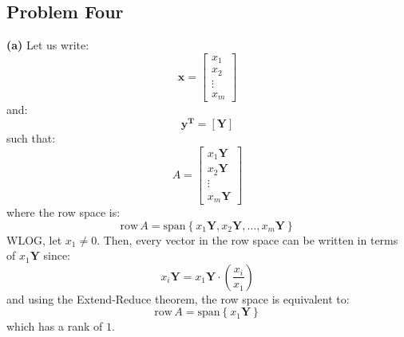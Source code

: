 \documentclass{article}
\newcommand{\spann}[1]{\mathrm{span}\left\{#1\right\}}
\newcommand{\row}[1]{\mathrm{row\,} #1}
\begin{document}
\subsection{Problem Four}
\noindent \textbf{(a)} Let us write:
\begin{equation}
    \bm{x} = \begin{bmatrix}
        x_1 \\ 
        x_2 \\ 
        \vdots \\ 
        x_m
    \end{bmatrix}
\end{equation}
and:
\begin{equation}
    \bm{y^T} = [\bm{Y}]
\end{equation}
such that:
\begin{equation}
    A = \begin{bmatrix}
        x_1\bm{Y} \\ 
        x_2\bm{Y} \\ 
        \vdots \\ 
        x_m\bm{Y}
    \end{bmatrix}
\end{equation}
where the row space is:
\begin{equation}
    \row A = \spann{x_1\bm{Y}, x_2\bm{Y}, \dots, x_m\bm{Y}}
\end{equation}
WLOG, let $x_1 \neq 0$. Then, every vector in the row space can be written in terms of $x_1\bm{Y}$ since:
\begin{equation}
    x_i \bm{Y} = x_1 \bm{Y} \cdot \left(\frac{x_i}{x_1}\right)
\end{equation}
and using the Extend-Reduce theorem, the row space is equivalent to:
\begin{equation}
    \row A = \spann{x_1\bm{Y}}
\end{equation}
which has a rank of $1$.
\vspace{2mm}
\end{document}
